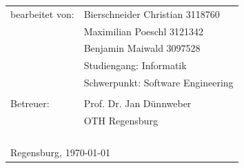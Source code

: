 \begin{small}
\begin{tabular}{ll}
bearbeitet von:\hspace{1cm} & Bierschneider Christian \hspace{0.5cm}3118760 \tabularnewline
 & Maximilian Poeschl \hspace{1.1cm}3121342 \tabularnewline
 & Benjamin Maiwald \hspace{1.25cm}3097528 \tabularnewline
 & Studiengang: Informatik \tabularnewline
 & Schwerpunkt: Software Engineering \tabularnewline
 & \tabularnewline

 
Betreuer: & Prof. Dr. Jan Dünnweber \tabularnewline
 & OTH Regensburg\tabularnewline
 & \tabularnewline
 & \tabularnewline
 & \tabularnewline
  & \tabularnewline
\multicolumn{2}{l}{Regensburg, \today}\tabularnewline
\end{tabular}
\end{small}